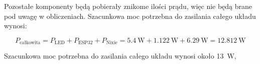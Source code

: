 \documentclass[../main.tex]{subfiles}
\begin{document}
Pozostałe komponenty będą pobierały znikome ilości prądu, więc nie będą brane pod uwagę w obliczeniach.
Szacunkowa moc potrzebna do zasilania całego układu wynosi:

\begin{equation}
    P_{\text{całkowita}} = P_{\text{LED}} + P_{\text{ESP32}} + P_{\text{Nixie}} = \SI{5.4}{\watt} + \SI{1.122}{\watt} + \SI{6.29}{\watt} = \SI{12.812}{\watt}
\end{equation}

Szacunkowa moc potrzebna do zasilania całego układu wynosi około \SI{13}{\watt}, 
\end{document}
